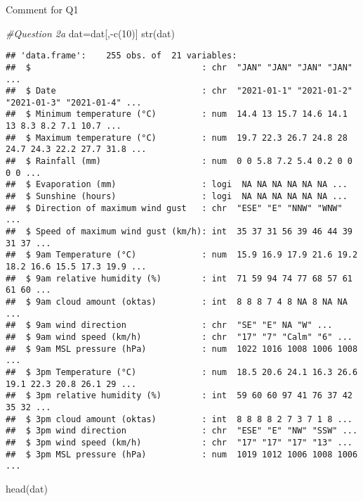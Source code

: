 \documentclass[
]{article}
\newenvironment{Shaded}{\begin{snugshade}}{\end{snugshade}}
\newcommand{\CommentTok}[1]{\textcolor[rgb]{0.56,0.35,0.01}{\textit{#1}}}
\newcommand{\DecValTok}[1]{\textcolor[rgb]{0.00,0.00,0.81}{#1}}
\newcommand{\FunctionTok}[1]{\textcolor[rgb]{0.00,0.00,0.00}{#1}}
\newcommand{\NormalTok}[1]{#1}
\newcommand{\OtherTok}[1]{\textcolor[rgb]{0.56,0.35,0.01}{#1}}
\newcommand{\SpecialCharTok}[1]{\textcolor[rgb]{0.00,0.00,0.00}{#1}}
\begin{document}
Comment for Q1

\begin{Shaded}
\begin{Highlighting}[]
\CommentTok{\#Question 2a}
\NormalTok{dat}\OtherTok{=}\NormalTok{dat[,}\SpecialCharTok{{-}}\FunctionTok{c}\NormalTok{(}\DecValTok{10}\NormalTok{)]}
\FunctionTok{str}\NormalTok{(dat)}
\end{Highlighting}
\end{Shaded}

\begin{verbatim}
## 'data.frame':    255 obs. of  21 variables:
##  $                                  : chr  "JAN" "JAN" "JAN" "JAN" ...
##  $ Date                             : chr  "2021-01-1" "2021-01-2" "2021-01-3" "2021-01-4" ...
##  $ Minimum temperature (°C)         : num  14.4 13 15.7 14.6 14.1 13 8.3 8.2 7.1 10.7 ...
##  $ Maximum temperature (°C)         : num  19.7 22.3 26.7 24.8 28 24.7 24.3 22.2 27.7 31.8 ...
##  $ Rainfall (mm)                    : num  0 0 5.8 7.2 5.4 0.2 0 0 0 0 ...
##  $ Evaporation (mm)                 : logi  NA NA NA NA NA NA ...
##  $ Sunshine (hours)                 : logi  NA NA NA NA NA NA ...
##  $ Direction of maximum wind gust   : chr  "ESE" "E" "NNW" "WNW" ...
##  $ Speed of maximum wind gust (km/h): int  35 37 31 56 39 46 44 39 31 37 ...
##  $ 9am Temperature (°C)             : num  15.9 16.9 17.9 21.6 19.2 18.2 16.6 15.5 17.3 19.9 ...
##  $ 9am relative humidity (%)        : int  71 59 94 74 77 68 57 61 61 60 ...
##  $ 9am cloud amount (oktas)         : int  8 8 8 7 4 8 NA 8 NA NA ...
##  $ 9am wind direction               : chr  "SE" "E" NA "W" ...
##  $ 9am wind speed (km/h)            : chr  "17" "7" "Calm" "6" ...
##  $ 9am MSL pressure (hPa)           : num  1022 1016 1008 1006 1008 ...
##  $ 3pm Temperature (°C)             : num  18.5 20.6 24.1 16.3 26.6 19.1 22.3 20.8 26.1 29 ...
##  $ 3pm relative humidity (%)        : int  59 60 60 97 41 76 37 42 35 32 ...
##  $ 3pm cloud amount (oktas)         : int  8 8 8 8 2 7 3 7 1 8 ...
##  $ 3pm wind direction               : chr  "ESE" "E" "NW" "SSW" ...
##  $ 3pm wind speed (km/h)            : chr  "17" "17" "17" "13" ...
##  $ 3pm MSL pressure (hPa)           : num  1019 1012 1006 1008 1006 ...
\end{verbatim}

\begin{Shaded}
\begin{Highlighting}[]
\FunctionTok{head}\NormalTok{(dat)}
\end{Highlighting}
\end{Shaded}
\end{document}

